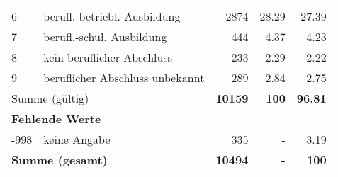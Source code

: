 \begin{longtable}{lXrrr}
     6 &
     \multicolumn{1}{X}{ berufl.-betriebl. Ausbildung   } &


       \num{2874} &
       \num[round-mode=places,round-precision=2]{28,29} &
         \num[round-mode=places,round-precision=2]{27,39} \\

     7 &
     \multicolumn{1}{X}{ berufl.-schul. Ausbildung   } &


       \num{444} &
       \num[round-mode=places,round-precision=2]{4,37} &
         \num[round-mode=places,round-precision=2]{4,23} \\

     8 &
     \multicolumn{1}{X}{ kein beruflicher Abschluss   } &


       \num{233} &
       \num[round-mode=places,round-precision=2]{2,29} &
         \num[round-mode=places,round-precision=2]{2,22} \\

     9 &
     \multicolumn{1}{X}{ beruflicher Abschluss unbekannt   } &


       \num{289} &
       \num[round-mode=places,round-precision=2]{2,84} &
         \num[round-mode=places,round-precision=2]{2,75} \\
     \midrule
     \multicolumn{2}{l}{Summe (gültig)} &
       \textbf{\num{10159}} &
     \textbf{100} &
       \textbf{\num[round-mode=places,round-precision=2]{96,81}} \\
     \multicolumn{5}{l}{\textbf{Fehlende Werte}}\\
       -998 &
       keine Angabe &
         \num{335} &
        - &
         \num[round-mode=places,round-precision=2]{3,19} \\
     \midrule
     \multicolumn{2}{l}{\textbf{Summe (gesamt)}} &
          \textbf{\num{10494}} &
        \textbf{-} &
        \textbf{100} \\
     \bottomrule
     \end{longtable}
     
